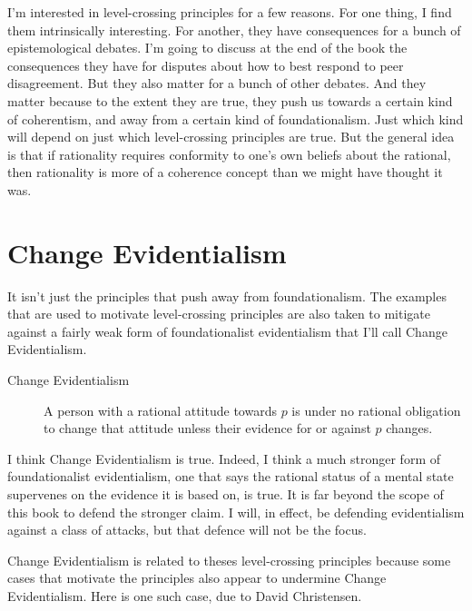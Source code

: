 I'm interested in level-crossing principles for a few reasons. For one thing, I find them intrinsically interesting. For another, they have consequences for a bunch of epistemological debates. I'm going to discuss at the end of the book the consequences they have for disputes about how to best respond to peer disagreement. But they also matter for a bunch of other debates. And they matter because to the extent they are true, they push us towards a certain kind of coherentism, and away from a certain kind of foundationalism. Just which kind will depend on just which level-crossing principles are true. But the general idea is that if rationality requires conformity to one's own beliefs about the rational, then rationality is more of a coherence concept than we might have thought it was.

\section{Change Evidentialism}
\label{changeevidentialism}

It isn't just the principles that push away from foundationalism. The examples that are used to motivate level-crossing principles are also taken to mitigate against a fairly weak form of foundationalist evidentialism that I'll call Change Evidentialism.

\begin{description}
\item[Change Evidentialism]

A person with a rational attitude towards $p$ is under no rational obligation to change that attitude unless their evidence for or against $p$ changes.
\end{description}
I think Change Evidentialism is true. Indeed, I think a much stronger form of foundationalist evidentialism, one that says the rational status of a mental state supervenes on the evidence it is based on, is true. It is far beyond the scope of this book to defend the stronger claim. I will, in effect, be defending evidentialism against a class of attacks, but that defence will not be the focus.

Change Evidentialism is related to theses level-crossing principles because some cases that motivate the principles also appear to undermine Change Evidentialism. Here is one such case, due to David Christensen.

